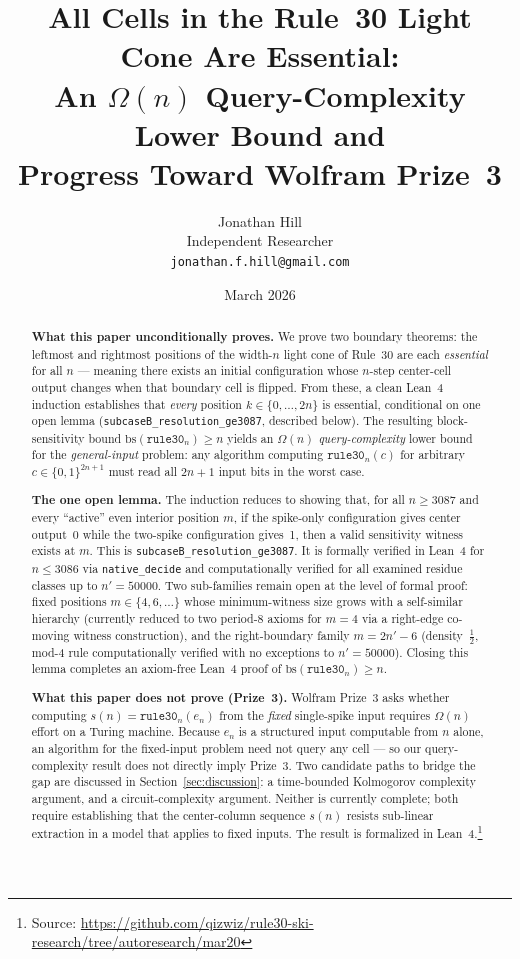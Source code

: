 \documentclass[11pt]{article}
\title{All Cells in the Rule~30 Light Cone Are Essential:\\
       An $\Omega(n)$ Query-Complexity Lower Bound and\\
       Progress Toward Wolfram Prize~3}
\author{Jonathan Hill\\
\small Independent Researcher\\
\small\texttt{jonathan.f.hill@gmail.com}}
\date{March 2026}
\theoremstyle{plain}
\theoremstyle{definition}
\begin{document}
\maketitle

\begin{abstract}
\textbf{What this paper unconditionally proves.}  We prove two boundary theorems: the
leftmost and rightmost positions of the width-$n$ light cone of Rule~30 are each
\emph{essential} for all $n$ --- meaning there exists an initial configuration whose
$n$-step center-cell output changes when that boundary cell is flipped.  From these,
a clean Lean~4 induction establishes that \emph{every} position $k \in \{0,\ldots,2n\}$
is essential, conditional on one open lemma (\texttt{subcaseB\_resolution\_ge3087},
described below).  The resulting block-sensitivity bound
$\mathrm{bs}(\mathtt{rule30}_n) \geq n$ yields an $\Omega(n)$ \emph{query-complexity}
lower bound for the \emph{general-input} problem: any algorithm computing
$\mathtt{rule30}_n(c)$ for arbitrary $c \in \{0,1\}^{2n+1}$ must read all $2n+1$
input bits in the worst case.

\textbf{The one open lemma.}  The induction reduces to showing that, for all $n \geq 3087$
and every ``active'' even interior position $m$, if the spike-only configuration gives
center output~0 while the two-spike configuration gives~1, then a valid sensitivity
witness exists at $m$.  This is \texttt{subcaseB\_resolution\_ge3087}.  It is formally
verified in Lean~4 for $n \leq 3086$ via \texttt{native\_decide} and computationally
verified for all examined residue classes up to $n' = 50000$.  Two sub-families remain
open at the level of formal proof: fixed positions $m \in \{4, 6, \ldots\}$ whose
minimum-witness size grows with a self-similar hierarchy (currently reduced to two
period-8 axioms for $m=4$ via a right-edge co-moving witness construction), and the
right-boundary family $m = 2n'{-}6$ (density~$\tfrac{1}{2}$, mod-4 rule
computationally verified with no exceptions to $n'=50000$).  Closing this lemma
completes an axiom-free Lean~4 proof of $\mathrm{bs}(\mathtt{rule30}_n) \geq n$.

\textbf{What this paper does not prove (Prize~3).}  Wolfram Prize~3 asks whether
computing $s(n) = \mathtt{rule30}_n(e_n)$ from the \emph{fixed} single-spike input
requires $\Omega(n)$ effort on a Turing machine.  Because $e_n$ is a structured input
computable from $n$ alone, an algorithm for the fixed-input problem need not query any
cell --- so our query-complexity result does not directly imply Prize~3.  Two candidate
paths to bridge the gap are discussed in Section~\ref{sec:discussion}: a time-bounded
Kolmogorov complexity argument, and a circuit-complexity argument.  Neither is currently
complete; both require establishing that the center-column sequence $s(n)$ resists
sub-linear extraction in a model that applies to fixed inputs.
The result is formalized in Lean~4.\footnote{Source:
\url{https://github.com/qizwiz/rule30-ski-research/tree/autoresearch/mar20}}
\end{abstract}
\end{document}
